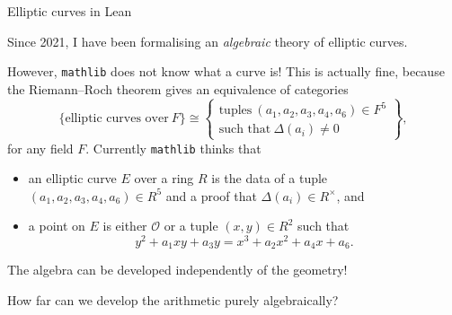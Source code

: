 \documentclass[10pt]{beamer}
\begin{document}
\begin{frame}[t]{Elliptic curves in Lean}

Since 2021, I have been formalising an \emph{algebraic} theory of elliptic curves.

\pause

\vspace{0.5cm} However, \texttt{mathlib} does not know what a curve is! This is actually fine, because the Riemann--Roch theorem gives an equivalence of categories
$$ \{\text{elliptic curves over} \ F\} \cong \left\{\begin{array}{c} \text{tuples} \ (a_1, a_2, a_3, a_4, a_6) \in F^5 \\ \text{such that} \ \Delta(a_i) \ne 0 \end{array}\right\}, $$
for any field $ F $. \pause Currently \texttt{mathlib} thinks that
\begin{itemize}
\item an elliptic curve $ E $ over a ring $ R $ is the data of a tuple $ (a_1, a_2, a_3, a_4, a_6) \in R^5 $ and a proof that $ \Delta(a_i) \in R^\times $, and
\item a point on $ E $ is either $ \mathcal{O} $ or a tuple $ (x, y) \in R^2 $ such that
$$ y^2 + a_1xy + a_3y = x^3 + a_2x^2 + a_4x + a_6. $$
\end{itemize}

\pause

The algebra can be developed independently of the geometry!

\vspace{0.5cm} How far can we develop the arithmetic purely algebraically?

\end{frame}
\end{document}
